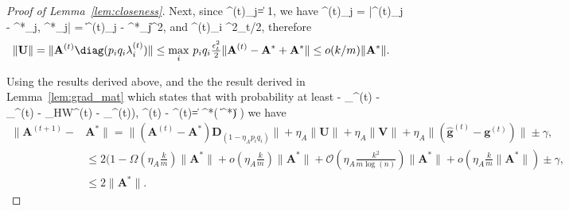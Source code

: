 \documentclass{article}
\newcommand{\HT}{{\c{T}}}
\newcommand{\gradmat}{\b{g}}
\def\[#1\]{{$#1$}}
\def\b#1{{\mathbf{#1}}}
\def\c#1{{\mathcal{#1}}}
\begin{document}
\begin{proof}[Proof of Lemma~\ref{lem:closeness}]
	Next, since \[\|\b{A}^{(t)}_j\| = 1\], we have \[\lambda^{(t)}_{j} = |\langle \b{A}^{(t)}_j - \b{A}^{*}_j, \b{A}^*_j\rangle| = \| \b{A}^{(t)}_j - \b{A}^{*}_j\|^2\], and \[\lambda^{(t)}_i \leq \epsilon^2_t/2\], therefore
	\begin{align*}
	\|\b{U}\| &= \|\b{A}^{(t)} \diag({p_i q_i\lambda^{(t)}_i}) \| \leq \underset{i}{\max}~p_i q_i\tfrac{\epsilon_t^2}{2}\|\b{A}^{(t)} - \b{A}^* + \b{A}^*\| \leq o(k/m) \| \b{A}^*\|.
	\end{align*}
	
	Using the results derived above, and the the result derived in Lemma~\ref{lem:grad_mat} which states that with probability at least \[(1 - \delta_{\beta}^{(t)} - \delta_{\HT}^{(t)} - \delta_{\rm HW}^{(t)} - \delta_\gradmat^{(t)})\], \[\|\hat{\b{g}}^{(t)} - \b{g}^{(t)}\| = ^*(  \|\b{A}^*\| ) )\] we have
	\begin{align*}
	\|\b{A}^{(t+1)} - &\b{A}^*\|= \|(\b{A}^{(t)} - \b{A}^*)\b{D}_{(1 - \eta_A p_i q_i)}\|  + \eta_A \|\b{U}\|  + \eta_A \|\b{V}\|  + \eta_A \|(\hat{\b{g}}^{(t)} -  \b{g}^{(t)})\| \pm \gamma,\\
	&\leq 2(1 -  \Omega(\eta_A \tfrac{k}{m}) \|\b{A}^*\|+    o(\eta_A \tfrac{k}{m})\|\b{A}^*\| +   \mathcal{O}( \eta_A \tfrac{k^2}{m\log(n)})\|\b{A}^*\|  + o(\eta_{A}\tfrac{k}{ m} \|\b{A}^*\| ) \pm \gamma,\\
	
	&\leq 2\|\b{A}^*\|.
	\end{align*}
\end{proof}
\end{document}
